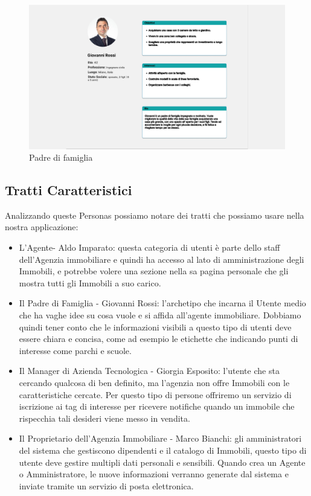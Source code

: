 \begin{figure}[H]
\centering
\caption{Padre di famiglia}
\includegraphics[width=1\textwidth]{Immagini/Personas/Personas-Padre di famiglia.png}
\end{figure}
\newpage
\subsection*{Tratti Caratteristici}
Analizzando queste Personas possiamo notare dei tratti che possiamo usare nella nostra applicazione:
\begin{itemize}
    \item  L'Agente- Aldo Imparato: questa categoria di utenti è parte dello staff dell'Agenzia immobiliare e quindi ha accesso al lato di amministrazione degli Immobili, e potrebbe volere una sezione nella sa pagina personale che gli mostra tutti gli Immobili a suo carico.
    \item  Il Padre di Famiglia - Giovanni Rossi: l'archetipo che incarna il Utente medio che ha vaghe idee su cosa vuole e si affida all'agente immobiliare. Dobbiamo quindi tener conto che le informazioni visibili a questo tipo di utenti deve essere chiara e concisa, come ad esempio le etichette che indicando punti di interesse come parchi e scuole.
    \item Il Manager di Azienda Tecnologica - Giorgia Esposito: l'utente che sta cercando qualcosa di ben definito, ma l'agenzia non offre Immobili con le caratteristiche cercate. Per questo tipo di persone offriremo un servizio di iscrizione ai tag di interesse per ricevere notifiche quando un immobile che rispecchia tali desideri viene messo in vendita.
    \item Il Proprietario dell'Agenzia Immobiliare - Marco Bianchi: gli amministratori del sistema che gestiscono dipendenti e il catalogo di Immobili, questo tipo di utente deve gestire multipli dati personali e sensibili. Quando crea un Agente o Amministratore, le nuove informazioni verranno generate dal sistema e inviate tramite un servizio di posta elettronica.
\end{itemize}
\newpage